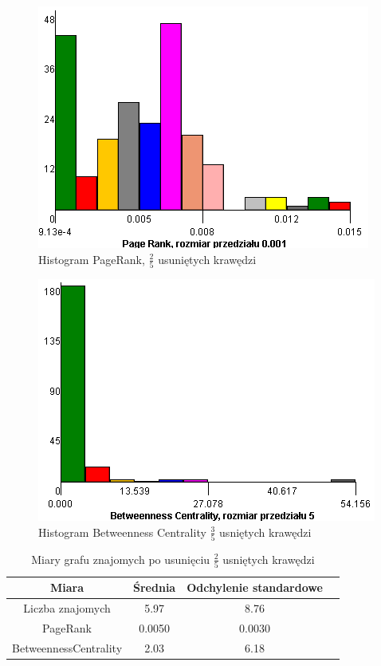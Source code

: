 \documentclass[10pt,a4paper]{article}
\begin{document}
\begin{figure}[H]
\centering
\caption{Histogram PageRank, $\frac{2}{5}$ usuniętych krawędzi}
\includegraphics[scale=0.6]{wyniki/final200Friends/2200friendsPRHist.png}
\end{figure}


\begin{figure}[H]
\centering
\caption{Histogram Betweenness Centrality $\frac{3}{5}$ usniętych krawędzi}
\includegraphics[scale=0.6]{wyniki/final200Friends/2200friendsBCHist.png}
\end{figure}

\begin{table}[H]
  \caption{Miary grafu znajomych po usunięciu  $\frac{2}{5}$ usniętych krawędzi}
  \centering
    \begin{tabular}{cccc}
    \addlinespace
    \toprule
    Miara & Średnia  & Odchylenie standardowe \\
    \midrule
    Liczba znajomych & 5.97 & 8.76 \\
    PageRank & 0.0050 & 0.0030 \\
    BetweennessCentrality & 2.03 & 6.18\\ 
    \bottomrule
    \end{tabular}
  \label{tab:addlabel}
\end{table}
\end{document}
